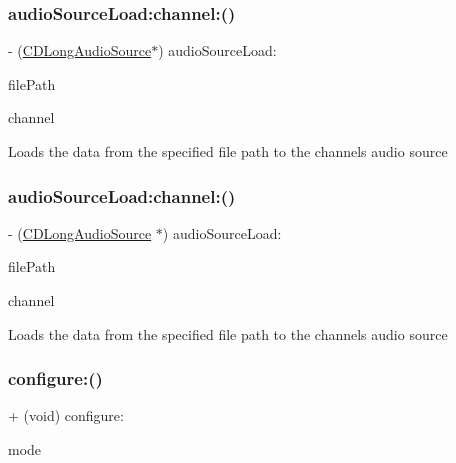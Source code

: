 \subsubsection{\texorpdfstring{audio\+Source\+Load\+:channel\+:()}{audioSourceLoad:channel:()}\hspace{0.1cm}{\footnotesize\ttfamily [3/4]}}
{\footnotesize\ttfamily -\/ (\hyperlink{interfaceCDLongAudioSource}{C\+D\+Long\+Audio\+Source}$\ast$) audio\+Source\+Load\+: \begin{DoxyParamCaption}\item[{(N\+S\+String $\ast$)}]{file\+Path }\item[{channel:(t\+Audio\+Source\+Channel)}]{channel }\end{DoxyParamCaption}}

Loads the data from the specified file path to the channel\textquotesingle{}s audio source \mbox{\label{interfaceCDAudioManager_aa3a8d9a65c6adbe4717435ea3ccc55ed}} 
\subsubsection{\texorpdfstring{audio\+Source\+Load\+:channel\+:()}{audioSourceLoad:channel:()}\hspace{0.1cm}{\footnotesize\ttfamily [4/4]}}
{\footnotesize\ttfamily -\/ (\hyperlink{interfaceCDLongAudioSource}{C\+D\+Long\+Audio\+Source} $\ast$) audio\+Source\+Load\+: \begin{DoxyParamCaption}\item[{(N\+S\+String$\ast$)}]{file\+Path }\item[{channel:(t\+Audio\+Source\+Channel)}]{channel }\end{DoxyParamCaption}}

Loads the data from the specified file path to the channel\textquotesingle{}s audio source \mbox{\label{interfaceCDAudioManager_a4565c81bdaefd40cad943440c7a438ab}} 
\subsubsection{\texorpdfstring{configure\+:()}{configure:()}\hspace{0.1cm}{\footnotesize\ttfamily [1/4]}}
{\footnotesize\ttfamily + (void) configure\+: \begin{DoxyParamCaption}\item[{(t\+Audio\+Manager\+Mode)}]{mode }\end{DoxyParamCaption}}

